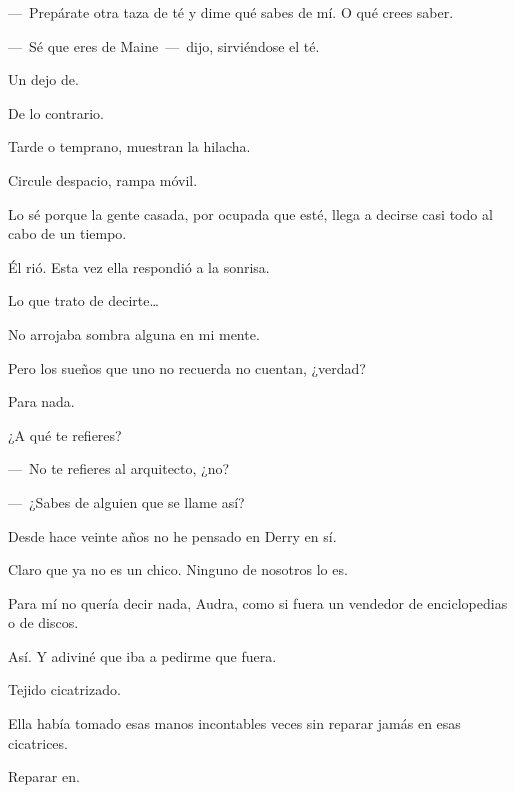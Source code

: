 ---~Prepárate otra taza de té y dime qué sabes de mí. O qué crees saber. 

\sk
---~Sé que eres de Maine~---~dijo, sirviéndose el té.  \nb{}

\sk
Un dejo de. 

\sk
De lo contrario. 

\sk
Tarde o temprano, muestran la hilacha. 

\sk
 Circule despacio, rampa móvil. 

\sk
Lo sé porque la gente casada, por ocupada que esté, llega a decirse casi todo al cabo de un tiempo. 

\sk
Él rió. Esta vez ella respondió a la sonrisa. \nb{}

\sk
Lo que trato de decirte\ldots{} 

\sk
No arrojaba sombra alguna en mi mente. 

\sk
Pero los sueños que uno no recuerda no cuentan, ¿verdad? \nb{}

\sk
Para nada. 

\sk
¿A qué te refieres? 

\sk
---~No te refieres al arquitecto, ¿no?

---~¿Sabes de alguien que se llame así?

\sk
Desde hace veinte años no he pensado en Derry en sí. 

\sk
Claro que ya no es un chico. Ninguno de nosotros lo es.\nb{}

\sk
Para mí no quería decir nada, Audra, como si fuera un vendedor de enciclopedias o de discos.\nb{}

\sk
 Así. Y adiviné que iba a pedirme que fuera. \nb{}

\sk
Tejido cicatrizado. 

\sk
Ella había tomado esas manos incontables veces sin reparar jamás en esas cicatrices.\nb{}

\sk
Reparar en. 


